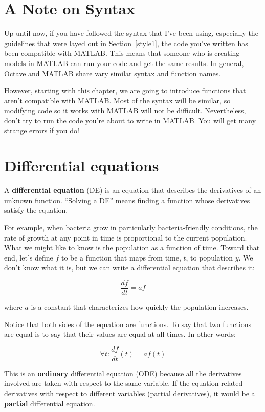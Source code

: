 \documentclass{book}
\begin{document}
\section{A Note on Syntax}

Up until now, if you have followed the syntax that I've been using, especially
the guidelines that were layed out in Section~\ref{style1}, the code you've
written has been compatible with MATLAB. This means that someone who is
creating models in MATLAB can run your code and get the same results. In
general, Octave and MATLAB share vary similar syntax and function names.

However, starting with this chapter, we are going to introduce functions that
aren't compatible with MATLAB. Most of the syntax will be similar, so modifying
code so it works with MATLAB will not be difficult. Nevertheless, don't try to
run the code you're about to write in MATLAB. You will get many strange errors
if you do!

\section{Differential equations}

A {\bf differential equation} (DE) is an equation that describes the
derivatives of an unknown function. ``Solving a DE'' means finding a
function whose derivatives satisfy the equation.

For example, when bacteria grow in particularly bacteria-friendly
conditions, the rate of growth at any point in time is proportional to
the current population. What we might like to know is the population
as a function of time. Toward that end, let's define $f$ to be a
function that maps from time, $t$, to population $y$. We don't
know what it is, but we can write a differential equation
that describes it:

\[ \frac{df}{dt} = a f \]

where $a$ is a constant that characterizes how quickly the population
increases.

Notice that both sides of the equation are functions. To say that
two functions are equal is to say that their values are equal at
all times. In other words:

\[ \forall t: \frac{df}{dt}(t) = a f(t) \]

This is an {\bf ordinary} differential equation (ODE) because all the
derivatives involved are taken with respect to the
same variable. If the equation related derivatives with respect to
different variables (partial derivatives), it would be a {\bf partial}
differential equation.
\end{document}
